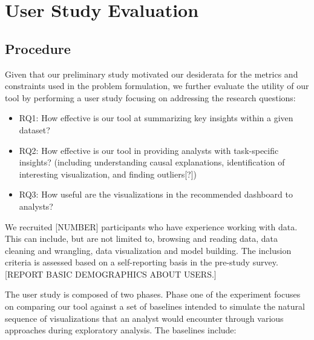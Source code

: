 \section{User Study Evaluation}
\subsection{Procedure}
Given that our preliminary study motivated our desiderata for the metrics and constraints used in the problem formulation, we further evaluate the utility of our tool by performing a user study focusing on addressing the research questions: 
\begin{itemize}
	\item RQ1: How effective is our tool at summarizing key insights within a given dataset?
	\item RQ2: How effective is our tool in providing analysts with task-specific insights? (including understanding causal explanations, identification of interesting visualization, and finding outliers[?])
	\item RQ3: How useful are the visualizations in the recommended dashboard to analysts?
\end{itemize}
\par We recruited [NUMBER] participants who have experience working with data. This can include, but are not limited to, browsing and reading data, data cleaning and wrangling, data visualization and model building. The inclusion criteria is assessed based on a self-reporting basis in the pre-study survey. [REPORT BASIC DEMOGRAPHICS ABOUT USERS.]
\par The user study is composed of two phases. Phase one of the experiment focuses on comparing our tool against a set of baselines intended to simulate the natural sequence of visualizations that an analyst would encounter through various approaches during exploratory analysis. The baselines include: 

